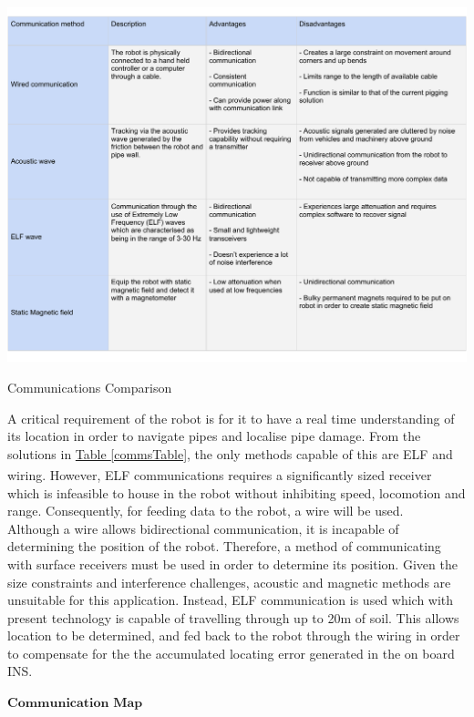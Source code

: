 \documentclass[11pt]{article}		%
\newcommand{\supercite}[1]{\textsuperscript{\cite{#1}}}		%
\newcommand{\tableref}[1]{\hyperref[#1]{Table \ref*{#1}}}     %
\begin{document}
	        \begin{table}[h]
				\centering
				\includegraphics[width=1\textwidth]{commstable.pdf}
				\caption{Communications Comparison}
				\label{commsTable}
			\end{table}
	     	A critical requirement of the robot is for it to have a real time understanding of its location in order to navigate pipes and localise pipe damage. 
	     	From the solutions in \tableref{commsTable}, the only methods capable of this are ELF and wiring. 
	     	However, ELF communications requires a significantly sized receiver\supercite{elfreceiversize} which is infeasible to house in the robot without inhibiting speed, locomotion and range. 
	     	Consequently, for feeding data to the robot, a wire will be used.
	        \\ 
	        \hspace*{3ex}Although a wire allows bidirectional communication, it is incapable of determining the position of the robot. 
	        Therefore, a method of communicating with surface receivers must be used in order to determine its position. 
	        Given the size constraints and interference challenges, acoustic and magnetic methods are unsuitable for this application. 
	        Instead, ELF communication is used which with present technology is capable of travelling through up to 20m of soil. 
	        This allows location to be determined, and fed back to the robot through the wiring in order to compensate for the the accumulated locating error generated in the on board INS.
	         
	        $\textbf{Communication Map}$
	        
\end{document}
